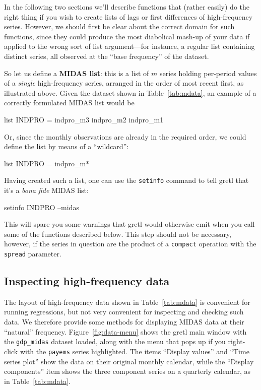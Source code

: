 In the following two sections we'll describe functions that (rather
easily) do the right thing if you wish to create lists of lags or
first differences of high-frequency series. However, we should first
be clear about the correct domain for such functions, since they could
produce the most diabolical mash-up of your data if applied to the
wrong sort of list argument---for instance, a regular list containing
distinct series, all observed at the ``base frequency'' of the
dataset.

So let us define a \textbf{MIDAS list}: this is a list of $m$ series
holding per-period values of a \textit{single} high-frequency series,
arranged in the order of most recent first, as illustrated
above. Given the dataset shown in Table~\ref{tab:mdata}, an example
of a correctly formulated MIDAS list would be
%
\begin{code}
list INDPRO = indpro_m3 indpro_m2 indpro_m1
\end{code}
%
Or, since the monthly observations are already in the required order,
we could define the list by means of a ``wildcard'':
%
\begin{code}
list INDPRO = indpro_m*
\end{code}

Having created such a list, one can use the \texttt{setinfo} command
to tell gretl that it's a \textit{bona fide} MIDAS list:
%
\begin{code}
setinfo INDPRO --midas
\end{code}
%
This will spare you some warnings that gretl would otherwise emit when
you call some of the functions described below. This step should not
be necessary, however, if the series in question are the product of a
\texttt{compact} operation with the \texttt{spread} parameter.

\subsection{Inspecting high-frequency data}

The layout of high-frequency data shown in Table~\ref{tab:mdata} is
convenient for running regressions, but not very convenient for
inspecting and checking such data. We therefore provide some methods
for displaying MIDAS data at their ``natural''
frequency. Figure~\ref{fig:data-menu} shows the gretl main window with
the \texttt{gdp\_midas} dataset loaded, along with the menu that pops
up if you right-click with the \texttt{payems} series highlighted.
The items ``Display values'' and ``Time series plot'' show the data
on their original monthly calendar, while the ``Display components''
item shows the three component series on a quarterly calendar, as
in Table~\ref{tab:mdata}.

